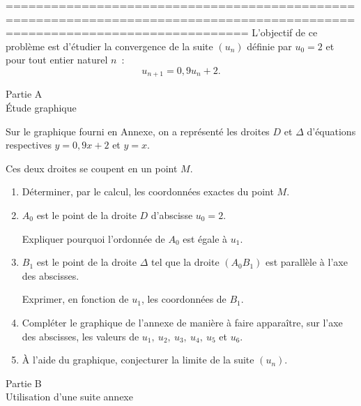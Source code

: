 %
%
\par
============================================================================================================================
L'objectif de ce problème est d'étudier la convergence de la suite $(u_n)$ définie par $u_0=2$ et pour tout entier naturel $n$~:
\[ u_{n+1} = 0,9u_n+2.\]
\begin{center}\begin{h3}Partie A\\ \'Etude graphique \end{h3}\end{center}
Sur le graphique fourni en Annexe, on a représenté les droites $D$ et $\Delta$ d'équations respectives $y=0,9x+2$ et $y=x$.
\par
Ces deux droites se coupent en un point $M$.
\begin{enumerate}
     \item
     Déterminer, par le calcul, les coordonnées exactes du point $M$.
     \item
     $A_0$ est le point de la droite $D$ d'abscisse $u_0=2$.
     \par
     Expliquer pourquoi l'ordonnée de $A_0$ est égale à $u_1$.
     \item
     $B_1$ est le point de la droite $\Delta$ tel que la droite $(A_0B_1)$ est parallèle à l'axe des abscisses.
     \par
     Exprimer, en fonction de $u_1$, les coordonnées de $B_1$.
     \item
     Compléter le graphique de l'annexe de manière à faire apparaître, sur l'axe des abscisses, les valeurs de $u_1,\ u_2,\ u_3,\ u_4,\ u_5$ et $u_6$.
     \item
     \`A l'aide du graphique, conjecturer la limite de la suite $(u_n)$.
\end{enumerate}
\begin{center}\begin{h3}Partie B\\ Utilisation d'une suite annexe \end{h3}\end{center}
